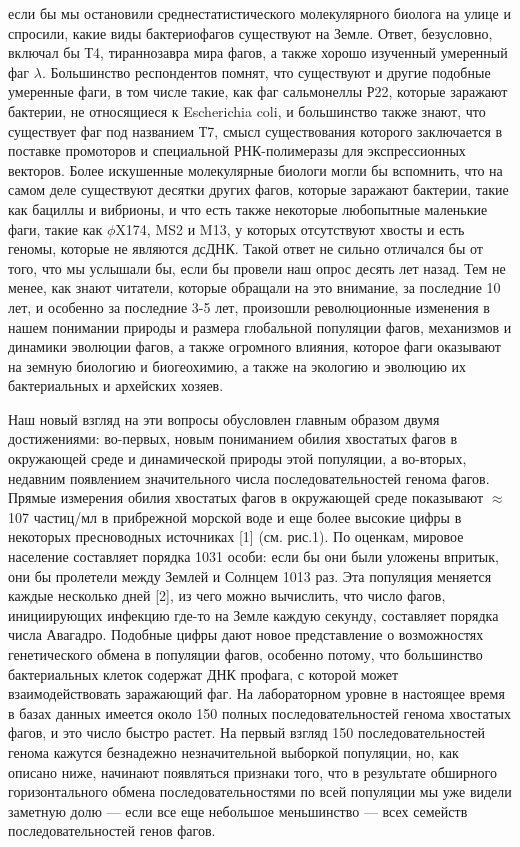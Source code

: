 \documentclass[a4paper,12pt]{article}
\begin{document}
    \par{если бы мы остановили среднестатистического молекулярного биолога на улице и спросили, какие виды бактериофагов
    существуют на Земле. Ответ, безусловно, включал бы Т4, тираннозавра мира фагов, а также хорошо изученный умеренный
    фаг \(\lambda\). Большинство респондентов помнят, что существуют и другие подобные умеренные фаги, в том числе
    такие, как фаг сальмонеллы Р22, которые заражают бактерии, не относящиеся к Escherichia coli, и большинство также
    знают, что существует фаг под названием Т7, смысл существования которого заключается в поставке промоторов и
    специальной РНК-полимеразы для экспрессионных векторов. Более искушенные молекулярные биологи могли бы вспомнить,
    что на самом деле существуют десятки других фагов, которые заражают бактерии, такие как бациллы и вибрионы, и что
    есть также некоторые любопытные маленькие фаги, такие как $\phi$X174, MS2 и M13, у которых отсутствуют хвосты и есть
    геномы, которые не являются дсДНК. Такой ответ не сильно отличался бы от того, что мы услышали бы, если бы провели
    наш опрос десять лет назад. Тем не менее, как знают читатели, которые обращали на это внимание, за последние 10 лет,
    и особенно за последние 3-5 лет, произошли революционные изменения в нашем понимании природы и размера глобальной
    популяции фагов, механизмов и динамики эволюции фагов, а также огромного влияния, которое фаги оказывают на земную
    биологию и биогеохимию, а также на экологию и эволюцию их бактериальных и архейских хозяев.}
    
    \par{Наш новый взгляд на эти вопросы обусловлен главным образом двумя достижениями: во-первых, новым пониманием
    обилия хвостатых фагов в окружающей среде и динамической природы этой популяции, а во-вторых, недавним появлением
    значительного числа последовательностей генома фагов. Прямые измерения обилия хвостатых фагов в окружающей среде
    показывают $\approx$107 частиц/мл в прибрежной морской воде и еще более высокие цифры в некоторых пресноводных источниках
    [1] (см. рис.1). По оценкам, мировое население составляет порядка 1031 особи: если бы они были уложены впритык, они
    бы пролетели между Землей и Солнцем 1013 раз. Эта популяция меняется каждые несколько дней [2], из чего можно
    вычислить, что число фагов, инициирующих инфекцию где-то на Земле каждую секунду, составляет порядка числа Авагадро.
    Подобные цифры дают новое представление о возможностях генетического обмена в популяции фагов, особенно потому, что
    большинство бактериальных клеток содержат ДНК профага, с которой может взаимодействовать заражающий фаг. На
    лабораторном уровне в настоящее время в базах данных имеется около 150 полных последовательностей генома хвостатых
    фагов, и это число быстро растет. На первый взгляд 150 последовательностей генома кажутся безнадежно незначительной
    выборкой популяции, но, как описано ниже, начинают появляться признаки того, что в результате обширного
    горизонтального обмена последовательностями по всей популяции мы уже видели заметную долю — если все еще небольшое
    меньшинство — всех семейств последовательностей генов фагов.}
    
\end{document}
